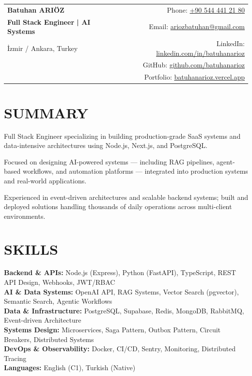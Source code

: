 \documentclass[a4paper,11pt]{article}
\makeatletter
\newcommand{\name}{Batuhan ARIÖZ}
\newcommand{\phone}{+90 544 441 21 80}
\newcommand{\emaila}{ariozbatuhan@gmail.com}
\makeatother
\begin{document}
{
\begin{tabularx}{\linewidth}{@{}X r@{}}
  \textbf{\Large \name} & Phone: \href{tel:+905444412180}{\phone} \\
  \textbf{Full Stack Engineer | AI Systems} & Email: \href{mailto:\emaila}{\emaila} \\
  İzmir / Ankara, Turkey & LinkedIn: \href{https://www.linkedin.com/in/batuhanarioz/}{linkedin.com/in/batuhanarioz} \\
   & GitHub: \href{https://github.com/batuhanarioz}{github.com/batuhanarioz} \\
   & Portfolio: \href{https://batuhanarioz.vercel.app}{batuhanarioz.vercel.app} \\
\end{tabularx}
}

\section{\textbf{SUMMARY}}
\noindent Full Stack Engineer specializing in building production-grade SaaS systems and data-intensive architectures using Node.js, Next.js, and PostgreSQL. 

\noindent Focused on designing AI-powered systems --- including RAG pipelines, agent-based workflows, and automation platforms --- integrated into production systems and real-world applications.

\noindent Experienced in event-driven architectures and scalable backend systems; built and deployed solutions handling thousands of daily operations across multi-client environments.

\section{\textbf{SKILLS}}
\begin{itemize}[leftmargin=0.05in, label={}]
\small{\item{
\textbf{Backend \& APIs:} Node.js (Express), Python (FastAPI), TypeScript, REST API Design, Webhooks, JWT/RBAC \\
\textbf{AI \& Data Systems:} OpenAI API, RAG Systems, Vector Search (pgvector), Semantic Search, Agentic Workflows \\
\textbf{Data \& Infrastructure:} PostgreSQL, Supabase, Redis, MongoDB, RabbitMQ, Event-driven Architecture \\
\textbf{Systems Design:} Microservices, Saga Pattern, Outbox Pattern, Circuit Breakers, Distributed Systems \\
\textbf{DevOps \& Observability:} Docker, CI/CD, Sentry, Monitoring, Distributed Tracing \\
\textbf{Languages:} English (C1), Turkish (Native)
}}
\end{itemize}
\end{document}
